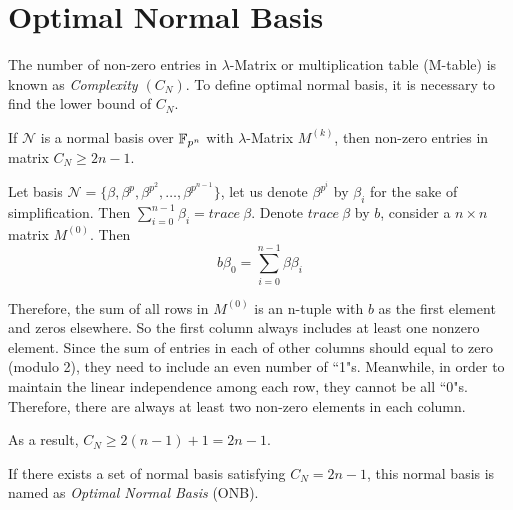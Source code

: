 \chapter{Optimal Normal Basis}
\label{append:ONB}
The number of non-zero entries in $\lambda$-Matrix or multiplication table (M-table) is known as \emph{Complexity $(C_N)$}.
To define optimal normal basis, it is necessary to find the lower bound of $C_N$.
\begin{Theorem}
If $\mathcal{N}$ is a normal basis over ${\mathbb{F}}_{p^n}$ with $\lambda$-Matrix $M^{(k)}$, then non-zero entries in matrix $C_N\geq 2n-1$.
\end{Theorem}
\begin{Proof}
Let basis $\mathcal{N} = \{\beta, \beta^p, \beta^{p^2},\dots, \beta^{p^{n-1}}\}$, let us denote $\beta^{p^i}$ by $\beta_i$ for the sake of simplification.
Then $\sum_{i=0}^{n-1} \beta_i = trace\ \beta$. 
Denote $trace\ \beta$ by $b$, consider a $n\times n$ matrix $M^{(0)}$. Then
$$b\beta_0 = \sum_{i=0}^{n-1} \beta \beta_i$$

Therefore, the sum of all rows in $M^{(0)}$ is an n-tuple with $b$ as the first element and zeros elsewhere.
So the first column always includes at least one nonzero element. 
Since the sum of entries in each of other columns should equal to zero (modulo 2), they 
need to include an even number of ``1"s.
Meanwhile, in order to maintain the linear independence among each row, they cannot be all ``0"s. 
Therefore, there are always at least two non-zero elements in each column.

As a result, $C_N \geq 2(n-1)+1  = 2n-1$.
\end{Proof}

If there exists a set of normal basis satisfying $C_N = 2n - 1$, this normal basis is named as 
\emph{Optimal Normal Basis} (ONB).

